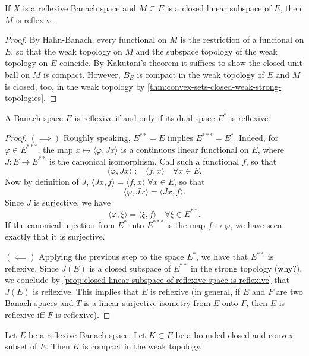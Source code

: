 \documentclass{article}
\theoremstyle{definition}
\numberwithin{equation}{section}
\begin{document}
\begin{prop}\label{prop:closed-linear-subspace-of-reflexive-space-is-reflexive}
	If $X$ is a reflexive Banach space and $M\subseteq E$ is a closed linear subspace of $E$, then $M$ is reflexive.
\end{prop}
\begin{proof}
	By Hahn-Banach, every functional on $M$ is the restriction of a funcional on $E$, so that the weak topology on $M$ and the subspace topology of the weak topology on $E$ coincide. By Kakutani's theorem it suffices to show the closed unit ball on $M$ is compact. However, $B_E$ is compact in the weak topology of $E$ and $M$ is closed, too, in the weak topology by \cref{thm:convex-sets-closed-weak-strong-topologies}.
\end{proof}
\begin{coro}\label{coro:space-reflexive-iff-dual-reflexive}
	A Banach space $E$ is reflexive if and only if its dual space $E^*$ is reflexive.
\end{coro}
\begin{proof}\leavevmode
	$(\implies)$ Roughly speaking, $E^{**}=E$ implies $E^{***}=E^*$. Indeed, for $\varphi\in E^{***}$, the map $x\mapsto\langle\varphi,Jx\rangle$ is a continuous linear functional on $E$, where $J:E\to E^{**}$ is the canonical isomorphism. Call such a functional $f$, so that
	\[\langle \varphi,Jx\rangle:=\langle f,x\rangle\quad\forall x\in E.\]
	Now by definition of $J$, $\langle Jx,f\rangle=\langle f,x\rangle\;\forall x\in E$, so that
	\[\langle\varphi , Jx\rangle=\langle Jx,f\rangle.\]
	Since $J$ is surjective, we have
	\[\langle \varphi,\xi\rangle=\langle \xi,f\rangle\quad\forall \xi\in E^{**}.\]
	If the canonical injection from $E^{*}$ into $E^{***}$ is the map $f\mapsto\varphi$, {\color{orange} we have seen exactly that it is surjective}.
	
	$(\impliedby)$ Applying the previous step to the space $E^*$, we have that $E^{**}$ is reflexive. Since $J(E)$ is a closed subspace of $E^{**}$ in the strong topology (why?), we conclude by \cref{prop:closed-linear-subspace-of-reflexive-space-is-reflexive} that $J(E)$ is reflexive. This implies that $E$ is reflexive (in general, if $E$ and $F$ are two Banach spaces and $T$ is a linear surjective isometry from $E$ onto $F$, then $E$ is reflexive iff $F$ is reflexive).	
\end{proof}
\begin{coro}
	Let $E$ be a reflexive Banach space. Let $K\subset E$ be a bounded closed and convex subset of $E$. Then $K$ is compact in the weak topology.
\end{coro}
\end{document}
